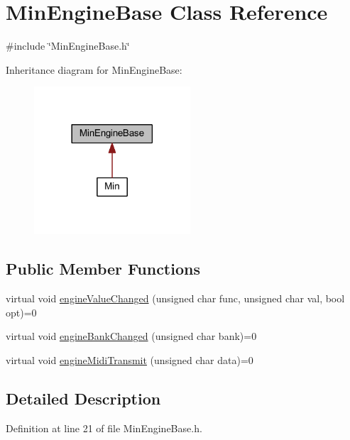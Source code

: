 \hypertarget{class_min_engine_base}{}\section{Min\+Engine\+Base Class Reference}
\label{class_min_engine_base}


{\ttfamily \#include \char`\"{}Min\+Engine\+Base.\+h\char`\"{}}



Inheritance diagram for Min\+Engine\+Base\+:
\nopagebreak
\begin{figure}[H]
\begin{center}
\leavevmode
\includegraphics[width=165pt]{class_min_engine_base__inherit__graph}
\end{center}
\end{figure}
\subsection*{Public Member Functions}
\begin{DoxyCompactItemize}
\item 
virtual void \hyperlink{class_min_engine_base_a35b19eb25b2bbfbcf0bc2262a63ec488}{engine\+Value\+Changed} (unsigned char func, unsigned char val, bool opt)=0
\item 
virtual void \hyperlink{class_min_engine_base_a7c1b890b5c7f0004969304880aaaf563}{engine\+Bank\+Changed} (unsigned char bank)=0
\item 
virtual void \hyperlink{class_min_engine_base_aaed6930bcc32b2cccf9479fb73d043d9}{engine\+Midi\+Transmit} (unsigned char data)=0
\end{DoxyCompactItemize}


\subsection{Detailed Description}


Definition at line 21 of file Min\+Engine\+Base.\+h.



